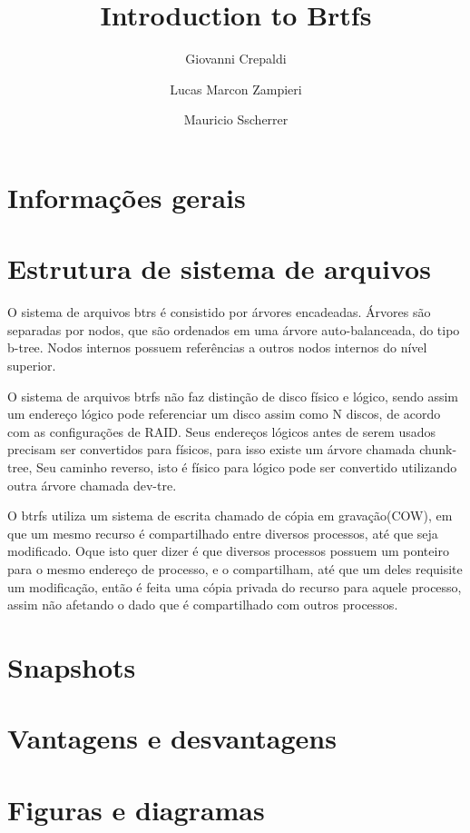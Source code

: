 \documentclass[12pt]{article}
\title{Introduction to Brtfs}
\author[1]{Giovanni Crepaldi}
\author[2]{Lucas Marcon Zampieri}
\author[3]{Mauricio Sscherrer}
\affil[1]{giovannecrepaldi@gmail.com}
\affil[2]{zampierilucas@unisinos.br}
\affil[3]{mauricio.sscherer@gmail.com}
\begin{document}
 

\maketitle

\section{Informações gerais} \label{sec:firstpage}

\section{Estrutura de sistema de arquivos}

O sistema de arquivos btrs é consistido por árvores encadeadas. Árvores são separadas por nodos, que são ordenados em uma árvore auto-balanceada, do tipo b-tree\cite{B-tree}. Nodos internos possuem referências a outros nodos internos do nível superior.

O sistema de arquivos btrfs não faz distinção de disco físico e lógico, sendo assim um endereço lógico pode referenciar um disco assim como N discos, de acordo com as configurações de RAID. Seus endereços lógicos antes de serem usados precisam ser convertidos para físicos, para isso existe um árvore chamada chunk-tree\cite{Btrfs-design}, Seu caminho reverso, isto é físico para lógico pode  ser convertido utilizando outra árvore chamada dev-tre.

O btrfs utiliza um sistema de escrita chamado de cópia em gravação(COW), em que um mesmo recurso é compartilhado entre diversos processos, até que seja modificado. Oque isto quer dizer é que diversos processos possuem um ponteiro para o mesmo endereço de processo, e o compartilham, até que um deles requisite um modificação, então é feita uma cópia privada do recurso para aquele processo, assim não afetando o dado que é compartilhado com outros processos. 
 
\section{Snapshots}

\section{Vantagens e desvantagens}

\section{Figuras e diagramas}\label{sec:figs}
\end{document}
